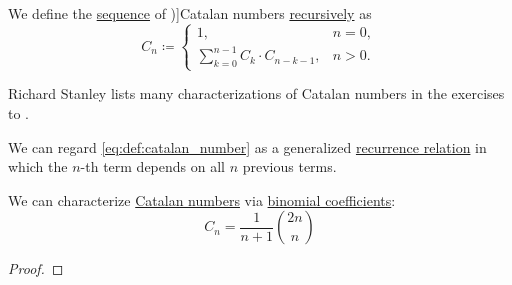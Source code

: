 \begin{definition}\label{def:catalan_number}
  We define the \hyperref[def:sequence]{sequence} of \term[ru=число Каталана (\cite[\S 5.7.4]{Новиков2013ДискретнаяМатематика})]{Catalan numbers} \hyperref[rem:natural_number_recursion]{recursively} as
  \begin{equation}\label{eq:def:catalan_number}
    C_n \coloneqq \begin{cases}
      1,                                    &n = 0, \\
      \sum_{k=0}^{n-1} C_k \cdot C_{n-k-1}, &n > 0.
    \end{cases}
  \end{equation}
\end{definition}
\begin{comments}
  \item Richard Stanley lists many characterizations of Catalan numbers in the exercises to \cite[ch. 6]{Stanley2023EnumCombinatoricsVol2}.

  \item We can regard \eqref{eq:def:catalan_number} as a generalized \hyperref[def:recurrence_relation]{recurrence relation} in which the \( n \)-th term depends on all \( n \) previous terms.
\end{comments}

\begin{proposition}\label{thm:catalan_number_via_binomial_coefficients}
  We can characterize \hyperref[def:catalan_number]{Catalan numbers} via \hyperref[def:binomial_coefficient]{binomial coefficients}:
  \begin{equation}\label{eq:thm:catalan_number_via_binomial_coefficients}
    C_n = \frac 1 {n + 1} \binom {2n} n
  \end{equation}
\end{proposition}
\begin{proof}
\end{proof}

